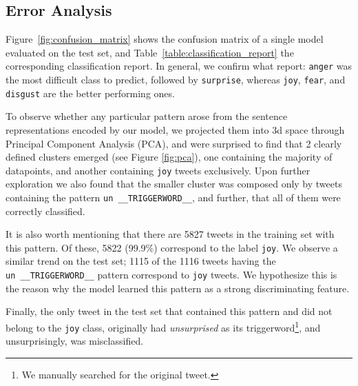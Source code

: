 \documentclass[11pt,a4paper]{article}
\begin{document}
\subsection{Error Analysis}

Figure~\ref{fig:confusion_matrix} shows the confusion matrix of a single model
evaluated on the test set, and Table~\ref{table:classification_report} the
corresponding classification report. In general, we confirm what
 report: \texttt{anger} was the most difficult class to
predict, followed by \texttt{surprise}, whereas \texttt{joy}, \texttt{fear}, and
\texttt{disgust} are the better performing ones.

To observe whether any particular pattern arose from the sentence
representations encoded by our model, we projected them into 3d space through
Principal Component Analysis (PCA), and were surprised to find that 2 clearly
defined clusters emerged (see Figure \ref{fig:pca}), one containing the majority
of datapoints, and another containing \texttt{joy} tweets exclusively. Upon
further exploration we also found that the smaller cluster was composed only by
tweets containing the pattern \texttt{un~\_\_TRIGGERWORD\_\_}, and further,
that all of them were correctly classified.

It is also worth mentioning that there are 5827 tweets in the training set with
this pattern. Of these, 5822 (99.9\%) correspond to the label \texttt{joy}. We
observe a similar trend on the test set; 1115 of the 1116 tweets having the
\texttt{un~\_\_TRIGGERWORD\_\_} pattern correspond to \texttt{joy} tweets. We
hypothesize this is the reason why the model learned this pattern as a strong
discriminating feature.

Finally, the only tweet in the test set that contained this pattern and did not
belong to the \texttt{joy} class, originally had \textit{unsurprised} as its
triggerword\footnote{We manually searched for the original tweet.}, and
unsurprisingly, was misclassified. 
\end{document}
